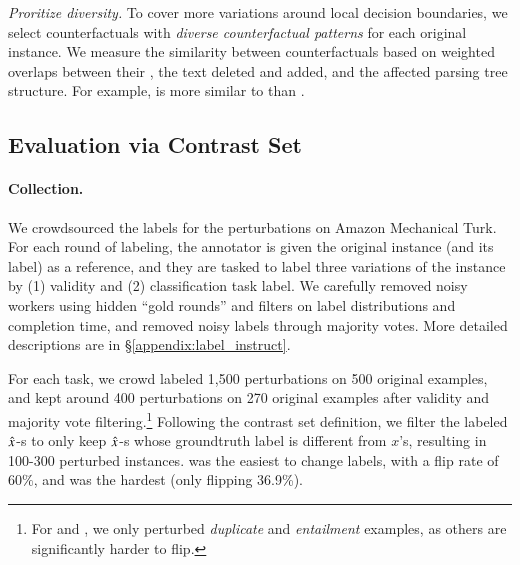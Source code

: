 \emph{Proritize diversity.}
To cover more variations around local decision boundaries, we select counterfactuals with \emph{diverse counterfactual patterns} for each original instance.
We measure the similarity between counterfactuals based on weighted overlaps between their \tagstrs, the text deleted and added, and the affected parsing tree structure. 
For example, \ctrltag{[lexical]}  is more similar to \ctrltag{[lexical]}  than \ctrltag{[quantifier]} .


\subsection{Evaluation via Contrast Set}
\label{subsec:contrast_set}

\paragraph{Collection.} 
We crowdsourced the labels for the perturbations on Amazon Mechanical Turk. 
For each round of labeling, the annotator is given the original instance (and its label) as a reference, and they are tasked to label three variations of the instance by (1) validity and (2) classification task label. 
We carefully removed noisy workers using hidden ``gold rounds'' and filters on label distributions and completion time, and removed noisy labels through majority votes.
More detailed descriptions are in \S\ref{appendix:label_instruct}. 

For each task, we crowd labeled 1,500 perturbations on 500 original examples, and kept around 400 perturbations on 270 original examples after validity and majority vote filtering.\footnote{For \qqp and \nli, we only perturbed \emph{duplicate} and \emph{entailment} examples, as others are significantly harder to flip.}
Following the contrast set definition, we filter the labeled $\hat{x}$-s to only keep $\hat{x}$-s whose groundtruth label is different from $x$'s, resulting in 100-300 perturbed instances.
\nli was the easiest to change labels, with a flip rate of $60\%$, and \sst was the hardest (only flipping 36.9\%).


